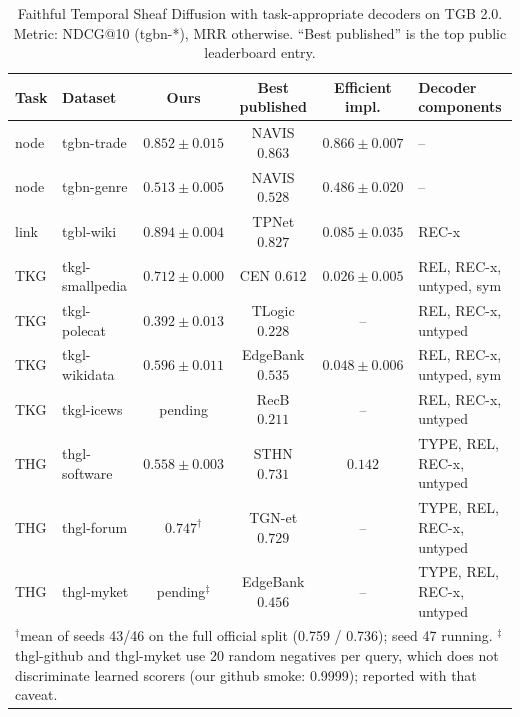 \begin{table}[t]
\centering\small
\caption{Faithful Temporal Sheaf Diffusion with task-appropriate decoders on
TGB 2.0. Metric: NDCG@10 (tgbn-*), MRR otherwise. ``Best published'' is the
top public leaderboard entry.}
\begin{tabular}{llcccl}
\toprule
Task & Dataset & Ours & Best published & Efficient impl. & Decoder components \\
\midrule
node  & tgbn-trade      & $0.852 \pm 0.015$ & NAVIS $0.863$        & $0.866 \pm 0.007$ & -- \\
node  & tgbn-genre      & $0.513 \pm 0.005$ & NAVIS $0.528$        & $0.486 \pm 0.020$ & -- \\
link  & tgbl-wiki       & $\mathbf{0.894 \pm 0.004}$ & TPNet $0.827$ & $0.085 \pm 0.035$ & REC-x \\
TKG   & tkgl-smallpedia & $\mathbf{0.712 \pm 0.000}$ & CEN $0.612$   & $0.026 \pm 0.005$ & REL, REC-x, untyped, sym \\
TKG   & tkgl-polecat    & $\mathbf{0.392 \pm 0.013}$ & TLogic $0.228$ & -- & REL, REC-x, untyped \\
TKG   & tkgl-wikidata   & $\mathbf{0.596 \pm 0.011}$ & EdgeBank $0.535$ & $0.048 \pm 0.006$ & REL, REC-x, untyped, sym \\
TKG   & tkgl-icews      & pending           & RecB $0.211$         & -- & REL, REC-x, untyped \\
THG   & thgl-software   & $0.558 \pm 0.003$ & STHN $0.731$         & $0.142$ & TYPE, REL, REC-x, untyped \\
THG   & thgl-forum      & $\mathbf{0.747}^{\dagger}$ & TGN-et $0.729$ & -- & TYPE, REL, REC-x, untyped \\
THG   & thgl-myket      & pending$^{\ddagger}$ & EdgeBank $0.456$  & -- & TYPE, REL, REC-x, untyped \\
\bottomrule
\multicolumn{6}{l}{\footnotesize $^{\dagger}$mean of seeds 43/46 on the full
official split (0.759 / 0.736); seed 47 running. $^{\ddagger}$thgl-github and
thgl-myket use 20 random negatives per query, which does not discriminate
learned scorers (our github smoke: 0.9999); reported with that caveat.}
\end{tabular}
\end{table}
